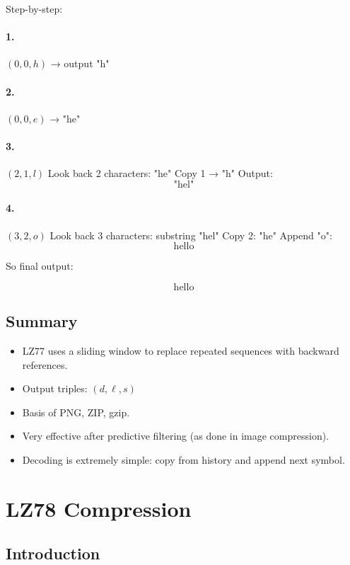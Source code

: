 \documentclass{AnantDocumentation}
\begin{document}
Step-by-step:

\paragraph{1.} \((0,0,h)\) → output "h"

\paragraph{2.} \((0,0,e)\) → "he"

\paragraph{3.} \((2,1,l)\)  
Look back 2 characters: "he"  
Copy 1 → "h"  
Output:
\[
\text{"hel"}
\]

\paragraph{4.} \((3,2,o)\)  
Look back 3 characters: substring "hel"  
Copy 2: "he"  
Append "o":  
\[
\text{hello}
\]

So final output:

\[
\boxed{\text{hello}}
\]

\subsection{Summary}

\begin{itemize}
\item LZ77 uses a sliding window to replace repeated sequences with backward references.
\item Output triples: \((d,\ell,s)\)
\item Basis of PNG, ZIP, gzip.
\item Very effective after predictive filtering (as done in image compression).
\item Decoding is extremely simple: copy from history and append next symbol.
\end{itemize}

\section{LZ78 Compression}

\subsection{Introduction}
\end{document}
